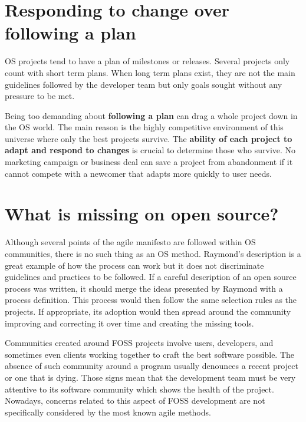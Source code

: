\section{Responding to change over following a plan}
\label{sec:fourth-princ}

OS projects tend to have a plan of milestones or releases. Several
projects only count with short term plans. When long term plans exist,
they are not the main guidelines followed by the developer team but
only goals sought without any pressure to be
met. %

Being too demanding about \textbf{following a plan} can drag a whole
project down in the OS world. The main reason is the highly
competitive environment of this universe where only the best projects
survive. The \textbf{ability of each project to adapt and respond to
  changes} is crucial to determine those who survive. No marketing
campaign or business deal can save a project from abandonment if it
cannot compete with a newcomer that adapts more quickly to user needs.

\section{What is missing on open source?}
\label{sec:os-summary}

Although several points of the agile manifesto are followed within OS
communities, there is no such thing as an OS method. Raymond's
description \cite{Raymond1999} is a great example of how the process
can work but it does not discriminate guidelines and practices to be
followed. If a careful description of an open source process was
written, it should merge the ideas presented by Raymond with a process
definition. This process would then follow the same selection rules as
the projects. If appropriate, its adoption would then spread around
the community improving and correcting it over time and creating the
missing tools.

Communities created around FOSS projects involve users, developers,
and sometimes even clients working together to craft the best software
possible. The absence of such community around a program usually
denounces a recent project or one that is dying. Those signs mean that
the development team must be very attentive to its software community
which shows the health of the project. Nowadays, concerns related to
this aspect of FOSS development are not specifically considered by the
most known agile methods.

